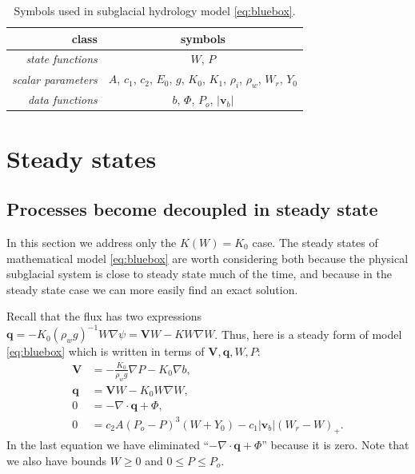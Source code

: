 \documentclass[11pt,final]{amsart}%
\newcommand\bv{\mathbf{v}}
\newcommand\bV{\mathbf{V}}
\newcommand\bq{\mathbf{q}}
\newcommand{\Div}{\nabla\cdot}
\newcommand{\grad}{\nabla}
\begin{document}
\begin{table}[ht]
\caption{Symbols used in subglacial hydrology model \eqref{eq:bluebox}.}
\begin{tabular}{r|c}
class & symbols \\ \hline
\emph{state functions} & $W$, $P$ \\
\emph{scalar parameters} & $A$, $c_1$, $c_2$, $E_0$, $g$, $K_0$, $K_1$, $\rho_i$, $\rho_w$, $W_r$, $Y_0$ \\
\emph{data functions} & $b$, $\Phi$, $P_o$, $|\bv_b|$ \\
\hline
\end{tabular}
\label{tab:symbols}
\end{table}


\section{Steady states}  \label{sec:steadyverif}

\subsection*{Processes become decoupled in steady state}  In this section we address only the $K(W)=K_0$ case.  The steady states of mathematical model \eqref{eq:bluebox} are worth considering both because the physical subglacial system is close to steady state much of the time, and because in the steady state case we can more easily find an exact solution.

Recall that the flux has two expressions $\bq = - K_0 (\rho_w g)^{-1} W \grad \psi = \bV W - K W \grad W$.  Thus, here is a steady form of model \eqref{eq:bluebox} which is written in terms of $\bV,\bq,W,P$:
\begin{align}
\bV &= - \frac{K_0}{\rho_w g} \grad P - K_0 \grad b, \label{eq:Vsteady} \\
\bq &= \bV W - K_0 W \grad W, \label{eq:qsteady} \\
0 &= - \Div \bq + \Phi, \label{eq:masscontsteady} \\
0 &= c_2 A (P_o - P)^3 (W+Y_0) - c_1 |\bv_b| (W_r - W)_+. \label{eq:openclosesteady}
\end{align}
In the last equation we have eliminated ``$- \Div \bq + \Phi$'' because it is zero.  Note that we also have bounds $W\ge 0$ and $0 \le P \le P_o$.
\end{document}
